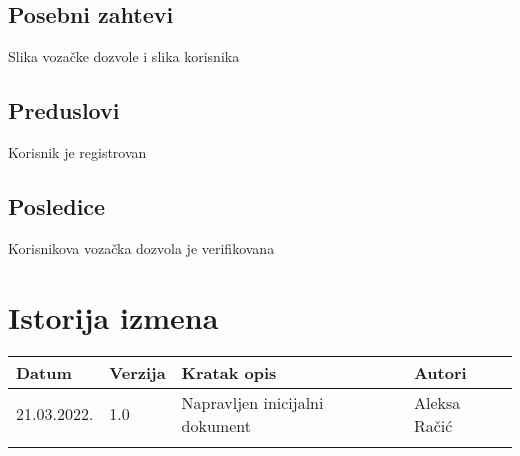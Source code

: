 \documentclass[12pt]{article}
\begin{document}
\subsection{Posebni zahtevi}
Slika vozačke dozvole i slika korisnika
\subsection{Preduslovi}
Korisnik je registrovan
\subsection{Posledice}
Korisnikova vozačka dozvola je verifikovana
\section{Istorija izmena}
\begin{center}
\begin{tabular}{ | m{2cm} | m{1.5cm}| m{6cm} | m{5cm} | } 
\hline
Datum & Verzija & Kratak opis & Autori \\ 
\hline
 21.03.2022. & 1.0 & Napravljen inicijalni dokument & Aleksa Račić\\ 
\hline
&&&\\ 
\hline
\end{tabular}
\end{center}
\end{document}
